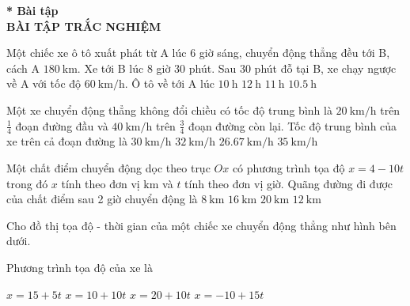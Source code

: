 \textbf{* Bài tập}\\
\setcounter{ex}{0}
\textbf{BÀI TẬP TRẮC NGHIỆM}
\begin{ex}
	Một chiếc xe ô tô xuất phát từ A lúc 6 giờ sáng, chuyển động thẳng đều tới B, cách A $\SI{180}{\kilo\meter}$. Xe tới B lúc 8 giờ 30 phút. Sau 30 phút đỗ tại B, xe chạy ngược về A với tốc độ $\SI{60}{\kilo\meter/\hour}$. Ô tô về tới A lúc
	\choice
	{$\SI{10}{\hour}$}
	{\True $\SI{12}{\hour}$}
	{$\SI{11}{\hour}$}
	{$\SI{10.5}{\hour}$}
	\loigiai{}
\end{ex}
\begin{ex}
	Một xe chuyển động thẳng không đổi chiều có tốc độ trung bình là $\SI{20}{\kilo\meter/\hour}$ trên  $\frac{1}{4}$ đoạn đường đầu và $\SI{40}{\kilo\meter/\hour}$ trên $\frac{3}{4}$ đoạn đường còn lại. Tốc độ trung bình của xe trên cả đoạn đường là 	
	\choice
	{$\SI{30}{\kilo\meter/\hour}$}
	{\True $\SI{32}{\kilo\meter/\hour}$}
	{$\SI{26.67}{\kilo\meter/\hour}$}
	{$\SI{35}{\kilo\meter/\hour}$}
	\loigiai{}
\end{ex}
\begin{ex}
	Một chất điểm chuyển động dọc theo trục $Ox$ có phương trình tọa độ $x=4-10t$ trong đó $x$ tính theo đơn vị $\si{\kilo\meter}$ và $t$ tính theo đơn vị giờ. Quãng đường đi được của chất điểm sau 2 giờ chuyển động là
	\choice
	{$\SI{8}{\kilo\meter}$}
	{$\SI{16}{\kilo\meter}$}
	{\True $\SI{20}{\kilo\meter}$}
	{$\SI{12}{\kilo\meter}$}
	\loigiai{}
\end{ex}
\begin{ex}
	Cho đồ thị tọa độ - thời gian của một chiếc xe chuyển động thẳng như hình bên dưới. 
	\begin{center}
	\end{center}
	Phương trình tọa độ của xe là
	
	\choice
	{$x=15+5t$}
	{\True $x=10+10t$}
	{$x=20+10t$}
	{$x=-10+15t$}
	\loigiai{}
\end{ex}
